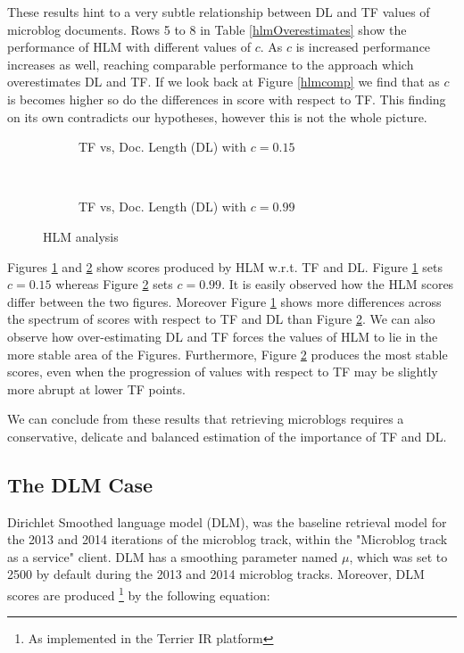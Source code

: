 These results hint to a very subtle relationship between DL and TF values of microblog documents. Rows 5 to 8 in Table \ref{hlmOverestimates} show the performance of HLM with different values of $c$. As $c$ is increased performance increases as well, reaching comparable performance to the approach which overestimates DL and TF. If we look back at Figure \ref{hlmcomp} we find that as $c$ is becomes higher so do the differences in score with respect to TF. This finding on its own contradicts our hypotheses, however this is not the whole picture.

\begin{figure}[]
     \begin{subfigure}[b]{0.5\textwidth}
      \centering
      \caption{TF vs, Doc. Length (DL)  with $c = 0.15$}
       
       	\label{cTFVSDL15}
    \end{subfigure}  
      ~
     \begin{subfigure}[b]{0.5\textwidth}
      \centering
      \caption{TF vs, Doc. Length (DL)  with $c = 0.99$}
       
       \label{cTFVSDL99}
    \end{subfigure}  
    \caption{HLM analysis}
	\label{cTFVSDL}
\end{figure}

Figures \ref{cTFVSDL15} and \ref{cTFVSDL99} show scores produced by HLM w.r.t. TF and DL. Figure \ref{cTFVSDL15} sets $c=0.15$ whereas Figure \ref{cTFVSDL99} sets $c=0.99$. It is easily observed how the HLM scores differ between the two figures. Moreover Figure \ref{cTFVSDL15} shows more differences across the spectrum of scores with respect to TF and DL than Figure \ref{cTFVSDL99}. We can also observe how over-estimating DL and TF forces the values of HLM to lie in the more stable area of the Figures. Furthermore, Figure \ref{cTFVSDL99} produces the most stable scores, even when the progression of values with respect to TF may be slightly more abrupt at lower TF points.

We can conclude from these results that retrieving microblogs requires a conservative, delicate and balanced estimation of the importance of TF and DL.

\subsection{The DLM Case}
Dirichlet Smoothed language model (DLM), was the baseline retrieval model for the 2013 and 2014 iterations of the microblog track, within the "Microblog track as a service" client. DLM has a smoothing parameter named $\mu$, which was set to 2500 by default during the 2013 and 2014 microblog tracks. Moreover, DLM scores are produced \footnote{As implemented in the Terrier IR platform} by the following equation:

